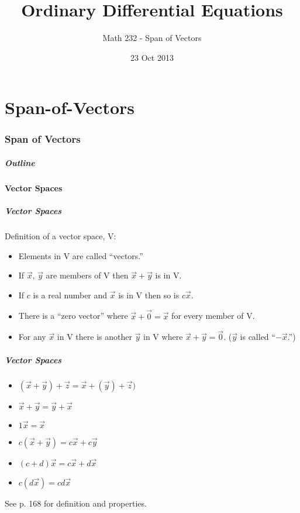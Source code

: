 \part{Span-of-Vectors}
\section{Span of Vectors}

\title{Ordinary Differential Equations}
\subtitle{Math 232 - Span of Vectors}
\date{23 Oct 2013}

\begin{frame}
  \titlepage
\end{frame}

\begin{frame}
  \frametitle{Outline}
  \tableofcontents[ currentsection ]
\end{frame}


\subsection{Vector Spaces}

\begin{frame}
  \frametitle{Vector Spaces}

  Definition of a vector space, V:
  \begin{itemize}
  \item Elements in V are called ``vectors.''
  \item If $\vec{x}$, $\vec{y}$ are members of V then
    $\vec{x}+\vec{y}$ is in V.
  \item If $c$ is a real number and $\vec{x}$ is in V then so is
    $c\vec{x}$.
  \item There is a ``zero vector'' where $\vec{x}+\vec{0}=\vec{x}$ for
    every member of V.
  \item For any $\vec{x}$ in V there is another $\vec{y}$ in V where
    $\vec{x}+\vec{y}=\vec{0}$. ($\vec{y}$ is called ``$-\vec{x}$.'')
  \end{itemize}


\end{frame}

\begin{frame}
  \frametitle{Vector Spaces}

  \begin{itemize}
  \item $(\vec{x}+\vec{y})+\vec{z}=\vec{x}+(\vec{y})+\vec{z})$
  \item $\vec{x}+\vec{y} = \vec{y}+\vec{x}$
  \item $1\vec{x} = \vec{x}$
  \item $c(\vec{x}+\vec{y})=c\vec{x}+c\vec{y}$
  \item $(c+d)\vec{x}=c\vec{x}+d\vec{x}$
  \item $c(d\vec{x}) = cd\vec{x}$  
  \end{itemize}

  See p. 168 for definition and properties.

\end{frame}


